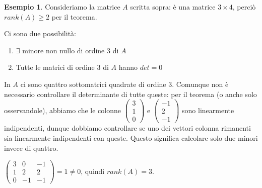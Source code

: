 \documentclass[a4paper]{report}
\theoremstyle{remark}
\theoremstyle{definition}
\newtheorem{es}{Esempio}
\begin{document}
\begin{es}
	Consideriamo la matrice $ A $ scritta sopra: è una matrice $ 3 \times 4 $, perciò $ rank(A) \geq 2 $ per il teorema.
	
	Ci sono due possibilità:
	\begin{enumerate}
		\item $ \exists $ minore non nullo di ordine 3 di $ A $
		\item Tutte le matrici di ordine 3 di $ A $ hanno $ det=0 $
	\end{enumerate}

	In $ A $ ci sono quattro sottomatrici quadrate di ordine 3. Comunque non è necessario controllare il determinante di tutte queste: per il teorema (o anche solo osservandole), abbiamo che le colonne $ 
	\begin{pmatrix}
		3\\
		1\\
		0
	\end{pmatrix} $ e $
	\begin{pmatrix}
		-1\\
		2\\
		-1
	\end{pmatrix} $ 
	sono linearmente indipendenti, dunque dobbiamo controllare se uno dei vettori colonna rimanenti sia linearmente indipendenti con queste. Questo significa calcolare solo due minori invece di quattro.
	
	
	$ 
	\begin{pmatrix}
		3&0&-1\\
		1&2&2\\
		0&-1&-1
	\end{pmatrix}
	=1\ne 0$, quindi $ rank(A)=3 $.
	
\end{es}
%
\end{document}

